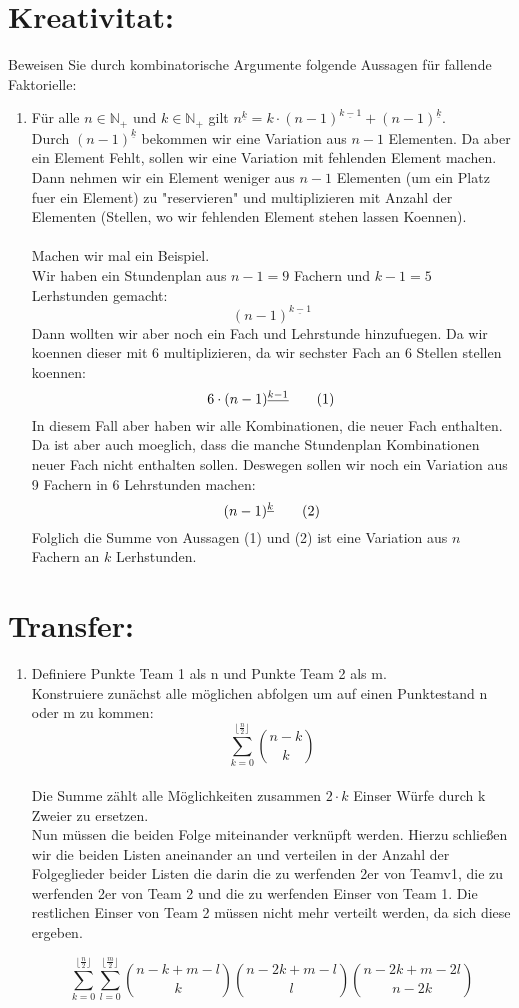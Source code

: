     \section*{Kreativitat:}
    Beweisen Sie durch kombinatorische Argumente folgende Aussagen für fallende Faktorielle:
    \begin{enumerate}[label=(\alph*)]
    \item Für alle $n \in \mathbb{N}_+$ und $k \in \mathbb{N}_+$ gilt 	
    $n^{\underline{k}} = k \cdot (n-1)^{\underline{k-1}} +(n-1)^{\underline{k}}$.\\
    Durch $(n-1)^{\underline{k}}$ bekommen wir eine Variation aus $n-1$ Elementen.
    Da aber ein Element Fehlt, sollen wir eine Variation mit fehlenden Element machen.
    Dann nehmen wir ein Element weniger aus $n-1$ Elementen (um ein Platz fuer ein Element) 
    zu "reservieren" und multiplizieren mit Anzahl der Elementen (Stellen, wo wir
    fehlenden Element stehen lassen Koennen). \\\\
    Machen wir mal ein Beispiel.\\
    Wir haben ein Stundenplan aus $n-1 = 9$ Fachern und $k-1 = 5$ Lerhstunden gemacht:
    \[(n-1)^{\underline{k-1}}\]
    Dann wollten wir aber noch ein Fach und Lehrstunde hinzufuegen. Da wir koennen
    dieser mit 6 multiplizieren, da wir sechster Fach an 6 Stellen stellen koennen: 
    \[6\cdot(n-1)^{\underline{k-1}} \textrm{\qquad (1)}\]
    In diesem Fall aber haben wir alle Kombinationen, die neuer Fach enthalten. 
    Da ist aber auch moeglich, dass die manche Stundenplan Kombinationen neuer Fach 
    nicht enthalten sollen. Deswegen sollen wir noch ein Variation aus 9 Fachern 
    in 6 Lehrstunden machen: 
    \[(n-1)^{\underline{k}} \textrm{\qquad (2)}\]
    Folglich die Summe von Aussagen (1) und (2) ist eine Variation aus $n$ Fachern 
    an $k$ Lerhstunden. 
        \end{enumerate}
    \section*{Transfer:}
    \begin{enumerate}[label=(\alph*)]
\item Definiere Punkte Team 1 als n und Punkte Team 2 als m.\\
		Konstruiere zunächst alle möglichen abfolgen um auf einen Punktestand n oder m zu kommen:
		$$\sum\limits_{k=0}^{\lfloor \frac{n}{2} \rfloor}\binom{n-k}{k}$$\\
		Die Summe zählt alle Möglichkeiten zusammen $2 \cdot k$ Einser Würfe durch k Zweier zu ersetzen. 
		\\
		Nun müssen die beiden Folge miteinander verknüpft werden.
		Hierzu schließen wir die beiden Listen aneinander an und verteilen in der Anzahl der Folgeglieder beider Listen die darin die zu werfenden 2er von Teamv1, die zu werfenden 2er von Team 2 und die zu werfenden Einser von Team 1. Die restlichen Einser von Team 2 müssen nicht mehr verteilt werden, da sich diese ergeben.
		
		$$ \sum\limits_{k=0}^{\lfloor \frac{n}{2} \rfloor} \sum\limits_{l=0}^{\lfloor\frac{m}{2}\rfloor}\binom{n-k+m-l}{k}\binom{n-2k+m-l}{l}\binom{n-2k+m-2l}{n-2k}$$
    \end{enumerate}
